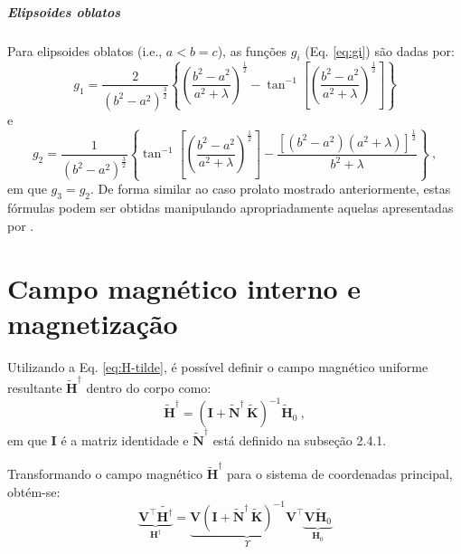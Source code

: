 \subparagraph*{Elipsoides oblatos}


Para elipsoides oblatos (i.e., $a < b = c$), as funções
$g_{i}$ (Eq. \ref{eq:gi}) são dadas por:
\begin{equation}
g_{1} =  \frac{2}{\left( b^{2} - a^{2} \right)^{\frac{3}{2}}}
\left\lbrace
\left( \frac{b^{2} - a^{2}}{a^{2} + \lambda}\right)^{\frac{1}{2}} -
\tan^{-1} \left[ \left( \frac{b^{2} - a^{2}}{a^{2} + \lambda}\right)^{\frac{1}{2}} \right]
\right\rbrace
\label{eq:g1-oblate}
\end{equation}
e
\begin{equation}
g_{2} =  \frac{1}{\left( b^{2} - a^{2} \right)^{\frac{3}{2}}}
\left\lbrace
\tan^{-1} \left[ \left( \frac{b^{2} - a^{2}}{a^{2} + \lambda}\right)^{\frac{1}{2}} \right] -
\frac{\left[ \left( b^{2} - a^{2} \right)
	\left( a^{2} + \lambda \right) \right]^{\frac{1}{2}}}
{b^{2} + \lambda}
\right\rbrace \: ,
\label{eq:g2-oblate}
\end{equation}
em que $g_{3} = g_{2}$.
De forma similar ao caso prolato mostrado anteriormente,
estas fórmulas podem ser obtidas manipulando apropriadamente aquelas
apresentadas por \citep{emerson1985}.

\section{Campo magnético interno e magnetização}

Utilizando a Eq. \ref{eq:H-tilde}, é possível definir o campo magnético uniforme resultante $\tilde{\mathbf{H}}^{\dagger}$ dentro do corpo como:
\begin{equation}
\tilde{\mathbf{H}}^{\dagger} = 
\left( \mathbf{I} + \tilde{\mathbf{N}}^{\dagger} \, \tilde{\mathbf{K}} \right)^{-1}
\tilde{\mathbf{H}}_{0} \: ,
\label{eq:Hi-tilde}
\end{equation}
em que $\mathbf{I}$ é a matriz identidade e
$\tilde{\mathbf{N}}^{\dagger}$ está definido na subseção 2.4.1.

Transformando o campo magnético $\tilde{\mathbf{H}}^{\dagger}$ para o sistema de coordenadas principal, obtém-se:
\begin{equation}
\underbrace{\mathbf{V}^{\top} \tilde{\mathbf{H}^{\dagger}}}_{\mathbf{H}^{\dagger}} =  
\underbrace{\mathbf{V} \left ( \mathbf{I} + \tilde{\mathbf{N}}^{\dagger} \, \tilde{\mathbf{K}} \right)^{-1} \mathbf{V}^{\top}}_{\Upsilon}
\underbrace{\mathbf{V} \tilde{\mathbf{H}}_{0}}_{\mathbf{H}_{0}}
\label{eq:Hi}
\end{equation}

